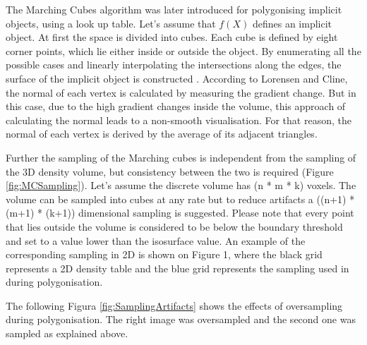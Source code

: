 \documentclass{subfiles}
\begin{document}
\par The Marching Cubes algorithm was later introduced for polygonising implicit objects, using a look up table. Let’s assume that $f(X)$ defines an implicit object. At first the space is divided into cubes. Each cube is defined by eight corner points, which lie either inside or outside the object. By enumerating all the possible cases and linearly interpolating the intersections along the edges, the surface of the implicit object is constructed \cite{Lorensen1987}. According to Lorensen and Cline, the normal of each vertex is calculated by measuring the gradient change. But in this case, due to the high gradient changes inside the volume, this approach of calculating the normal leads to a non-smooth visualisation. For that reason, the normal of each vertex is derived by the average of its adjacent triangles. 

\par Further the sampling of the Marching cubes is independent from the sampling of the 3D density volume, but consistency between the two is required (Figure \ref{fig:MCSampling}). Let’s assume the discrete volume has (n * m * k) voxels. The volume can be sampled into cubes at any rate but to reduce artifacts a ((n+1) *(m+1) * (k+1)) dimensional sampling is suggested. Please note that every point that lies outside the volume is considered to be below the boundary threshold and set to a value lower than the isosurface value. An example of the corresponding sampling in 2D is shown on Figure 1, where the black grid represents a 2D density table and the blue grid represents the sampling used in during polygonisation.

\par The following Figura \ref{fig:SamplingArtifacts} shows the effects of oversampling during polygonisation. The right image was oversampled and the second one was sampled as explained above.
\end{document}
